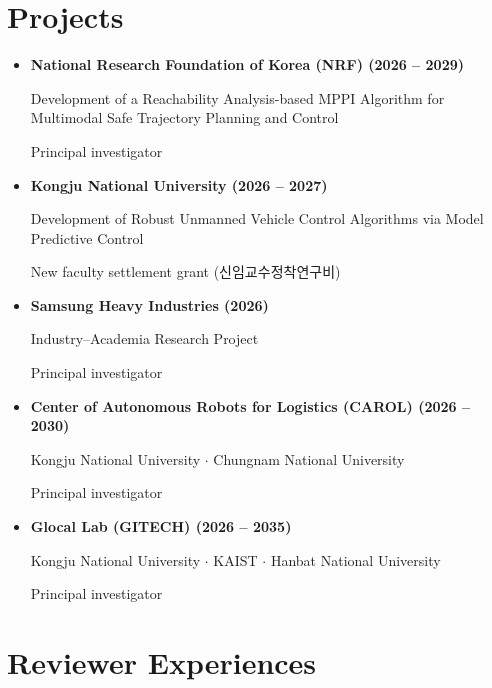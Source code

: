 \documentclass[10pt, letterpaper]{article}
\begin{document}
    \section{Projects}
    \begin{itemize}
        \item [\textbf{[P5]}] \textbf{National Research Foundation of Korea (NRF) (2026 -- 2029)}

        Development of a Reachability Analysis-based MPPI Algorithm for Multimodal Safe Trajectory Planning and Control

        \textcolor{NavyBlue}{Principal investigator}

        \item [\textbf{[P4]}] \textbf{Kongju National University (2026 -- 2027)}

        Development of Robust Unmanned Vehicle Control Algorithms via Model Predictive Control

        \textcolor{NavyBlue}{New faculty settlement grant (신임교수정착연구비)}

        \item [\textbf{[P3]}] \textbf{Samsung Heavy Industries (2026)}

        Industry--Academia Research Project

        \textcolor{NavyBlue}{Principal investigator}

        \item [\textbf{[P2]}] \textbf{Center of Autonomous Robots for Logistics (CAROL) (2026 -- 2030)}

        Kongju National University $\cdot$ Chungnam National University

        \textcolor{NavyBlue}{Principal investigator}

        \item [\textbf{[P1]}] \textbf{Glocal Lab (GITECH) (2026 -- 2035)}

        Kongju National University $\cdot$ KAIST $\cdot$ Hanbat National University

        \textcolor{NavyBlue}{Principal investigator}

    \end{itemize}

    \section{Reviewer Experiences}
\end{document}

